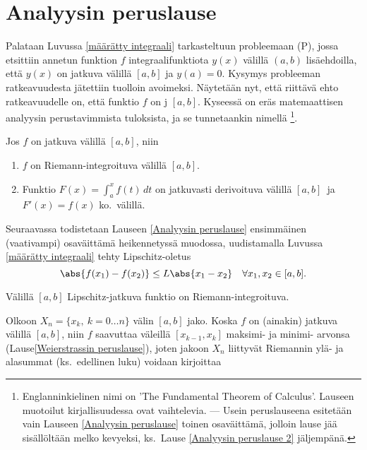 \section{Analyysin peruslause} \label{analyysin peruslause}
\alku
Palataan Luvussa \ref{määrätty integraali} tarkasteltuun probleemaan (P), jossa etsittiin
annetun funktion $f$ integraalifunktiota $y(x)$ välillä $(a,b)$ lisäehdoilla, että $y(x)$ on
jatkuva välillä $[a,b]$ ja $y(a)=0$. Kysymys probleeman ratkeavuudesta jätettiin tuolloin
avoimeksi. Näytetään nyt, että riittävä ehto ratkeavuudelle on, että funktio $f$ on
 j  $[a,b]$. Kyseessä on eräs matemaattisen analyysin
perustavimmista tuloksista, ja se tunnetaankin nimellä
\footnote[2]{Englanninkielinen nimi on 'The Fundamental Theorem of
Calculus'. Lauseen muotoilut kirjallisuudessa ovat vaihtelevia. --- Usein peruslauseena
esitetään vain Lauseen \ref{Analyysin peruslause} toinen osaväittämä, jolloin lause jää
sisällöltään melko kevyeksi, ks.\ Lause \ref{Analyysin peruslause 2} jäljempänä.}.
\begin{*Lause} \label{Analyysin peruslause} 
 
Jos $f$ on jatkuva välillä $[a,b]$, niin
\begin{enumerate}
\item $f$ on Riemann-integroituva välillä $[a,b]$.
\item Funktio $F(x)=\int_a^x f(t)\, dt$ on jatkuvasti derivoituva välillä $[a,b]\,$ ja \\
      $F'(x)=f(x)$ ko.\ välillä.
\end{enumerate}
\end{*Lause}
Seuraavassa todistetaan Lauseen \ref{Analyysin peruslause} ensimmäinen (vaativampi) osaväittämä
heikennetyssä muodossa, uudistamalla Luvussa \ref{määrätty integraali} tehty Lipschitz-oletus
\[
\abs{f(x_1)-f(x_2)}\leq L\abs{x_1-x_2}\quad\forall x_1,x_2\in [a,b].
\]
\begin{Lause} \label{Analyysin peruslause 1} Välillä $[a,b]$ Lipschitz-jatkuva funktio on
Riemann-integroituva.%
\end{Lause}
\tod Olkoon $X_n=\{x_k,\ k=0 \ldots n\}$ välin $[a,b]$ jako. Koska $f$ on (ainakin) jatkuva
välillä $[a,b]$, niin $f$ saavuttaa väleillä $[x_{k-1},x_k]$ maksimi- ja minimi-\linebreak
arvonsa (Lause\ref{Weierstrassin peruslause}), joten jakoon $X_n$ liittyvät Riemannin ylä- ja
alasummat \linebreak (ks.\ edellinen luku) voidaan kirjoittaa
